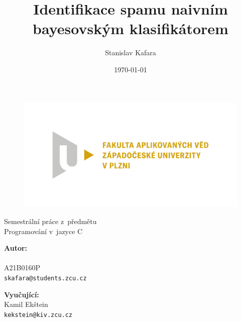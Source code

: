 \documentclass[a4paper, 12pt]{report}
\title{Identifikace spamu naivním bayesovským klasifikátorem}
\author{Stanislav Kafara}
\date{\today}
\begin{document}
\begin{titlepage}

\begin{center}

\begin{figure}
\centering
\includegraphics[width=.75\textwidth]{FAV_logo}
\end{figure}

\vspace{4\baselineskip}

Semestrální práce z~předmětu\\
Programování v~jazyce C

\vspace{2\baselineskip}

{\makeatletter
\LARGE \bfseries \@title
\makeatother}

\end{center}

\vfill

\begin{flushleft}

\textbf{Autor:}\\
{\makeatletter
\@author
\makeatother}\\
A21B0160P\\
\texttt{skafara@students.zcu.cz}

\vspace{\baselineskip}

\textbf{Vyučující:}\\
Kamil Ekštein\\
\texttt{kekstein@kiv.zcu.cz}

\end{flushleft}

\end{titlepage}

\begin{tableofcontents}

\end{tableofcontents}
\end{document}
